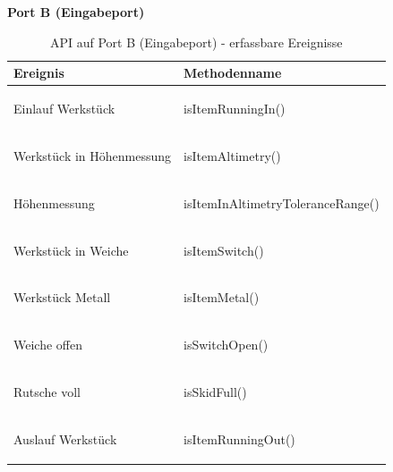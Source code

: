 \documentclass[a4paper, 11pt]{article}
\begin{document}
\noindent\textbf{Port B (Eingabeport)}
\begin{table}[h]
\center
\begin{tabularx}{\textwidth}{|X|X|}
\hline
\textbf{Ereignis}&\textbf{Methodenname}\\
\hline
Einlauf Werkstück&\begin{compactenum}[]
           \item \ttfamily isItemRunningIn()
           \end{compactenum}\\
\hline
Werkstück in Höhenmessung&\begin{compactenum}[]
           \item \ttfamily isItemAltimetry()
           \end{compactenum}\\
\hline
Höhenmessung&\begin{compactenum}[]
           \item \ttfamily isItemInAltimetryToleranceRange()
           \end{compactenum}\\
\hline
Werkstück in Weiche&\begin{compactenum}[]
           \item \ttfamily isItemSwitch()
           \end{compactenum}\\
\hline
Werkstück Metall&\begin{compactenum}[]
           \item \ttfamily isItemMetal()
           \end{compactenum}\\
\hline
Weiche offen&\begin{compactenum}[]
           \item \ttfamily isSwitchOpen()
           \end{compactenum}\\
\hline
Rutsche voll&\begin{compactenum}[]
           \item \ttfamily isSkidFull()
           \end{compactenum}\\
\hline
Auslauf Werkstück&\begin{compactenum}[]
           \item \ttfamily isItemRunningOut()
           \end{compactenum}\\
\hline
\end{tabularx}
\caption{API auf Port B (Eingabeport) - erfassbare Ereignisse}
\label{portB}
\end{table}
\end{document}
